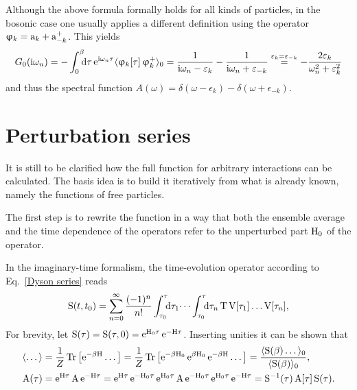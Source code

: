 Although the above formula formally holds for all kinds of particles, in the
bosonic case one usually applies a different definition using the operator
$\upvarphi_k = \mathrm a_k + \mathrm a_{-k}^+$. This yields
%
\begin{equation} \label{D_0(i omega_n)}
    G_0(\I \omega_n) = -\int \from 0 \till \beta \D \tau \,
    \E^{\I \omega_n \tau} \av{\upphi_k[\tau] \, \upphi_k^+}_0
    = \frac 1 {\I \omega_n - \epsilon_k} - \frac 1 {\I \omega_n + \epsilon_{-k}}
    \overset{\epsilon_k = \epsilon_{-k}} =
    -\frac{2 \epsilon_k}{\omega_n^2 + \epsilon_k^2}
\end{equation}
%
and thus the spectral function $A(\omega) = \delta(\omega - \epsilon_k) -
\delta(\omega + \epsilon_{-k})$.

\section{Perturbation series}

It is still to be clarified how the full  function for arbitrary
interactions can be calculated. The basis idea is to build it iteratively from
what is already known, namely the  functions of free particles.

The first step is to rewrite the  function in a way that both the
ensemble average and the time dependence of the operators refer to the
unperturbed part $\mathrm H_0$ of the  operator.

In the imaginary-time formalism, the time-evolution operator according to
Eq.~\ref{Dyson series} reads
%
\begin{equation} \label{Matsubara-Dyson series}
    \op S(t, t_0) = \sum_{n = 0}^\infty \frac{(-1)^n}{n!}
    \int \from{\tau_0} \till \tau \D \tau_1 \dots
    \int \from{\tau_0} \till \tau \D \tau_n \,
    \op T \, \op V[\tau_1] \dots \op V[\tau_n],
\end{equation}
%
For brevity, let $\mathrm S(\tau) = \mathrm S(\tau, 0) = \mathrm e^{\mathrm H_0 \tau} \, \mathrm e^{-\mathrm H
\tau}$. Inserting unities it can be shown that
%
\begin{align*}
    \langle\dots\rangle &= \frac 1 Z \operatorname{Tr} \big[ \mathrm e^{-\beta \mathrm H} \dots \big]
    = \frac 1 Z \operatorname{Tr} \big[
        \mathrm e^{-\beta \mathrm H_0} \, \mathrm e^{\beta \mathrm H_0} \, \mathrm e^{-\beta \mathrm H} \dots
    \big]
    = \frac{\langle\mathrm S(\beta) \dots\rangle_0}{\langle\mathrm S(\beta)\rangle_0},
    \\
    \mathrm A(\tau) &= \mathrm e^{\mathrm H \tau} \, \mathrm A \, \mathrm e^{-\mathrm H \tau}
    = \mathrm e^{\mathrm H \tau} \, \mathrm e^{-\mathrm H_0 \tau} \,
    \mathrm e^{\mathrm H_0 \tau} \, \mathrm A \, \mathrm e^{-\mathrm H_0 \tau} \,
    \mathrm e^{\mathrm H_0 \tau} \, \mathrm e^{-\mathrm H \tau}
    = \mathrm S^{-1}(\tau) \, \mathrm A[\tau] \, \mathrm S(\tau).
\end{align*}

